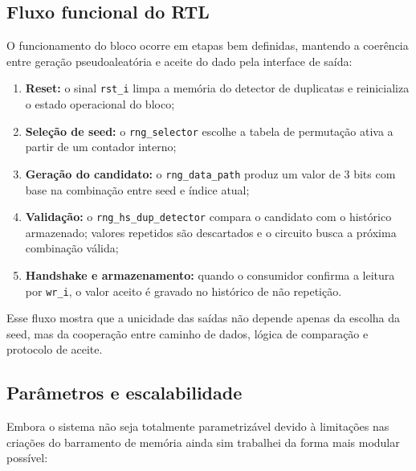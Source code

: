 \documentclass[12pt,a4paper]{article}
\begin{document}
	\subsection*{Fluxo funcional do RTL}
	
	O funcionamento do bloco ocorre em etapas bem definidas, mantendo a coerência entre geração pseudoaleatória e aceite do dado pela interface de saída:
	
	\begin{enumerate}[leftmargin=1.6em]
		\item \textbf{Reset:} o sinal \texttt{rst\_i} limpa a memória do detector de duplicatas e reinicializa o estado operacional do bloco;
		\item \textbf{Seleção de seed:} o \texttt{rng\_selector} escolhe a tabela de permutação ativa a partir de um contador interno;
		\item \textbf{Geração do candidato:} o \texttt{rng\_data\_path} produz um valor de 3 bits com base na combinação entre seed e índice atual;
		\item \textbf{Validação:} o \texttt{rng\_hs\_dup\_detector} compara o candidato com o histórico armazenado; valores repetidos são descartados e o circuito busca a próxima combinação válida;
		\item \textbf{Handshake e armazenamento:} quando o consumidor confirma a leitura por \texttt{wr\_i}, o valor aceito é gravado no histórico de não repetição.
	\end{enumerate}
	
	Esse fluxo mostra que a unicidade das saídas não depende apenas da escolha da seed, mas da cooperação entre caminho de dados, lógica de comparação e protocolo de aceite.
	
	\subsection*{Parâmetros e escalabilidade}
	
	Embora o sistema não seja totalmente parametrizável devido à limitações nas criações do barramento de memória ainda sim trabalhei da forma mais modular possível:
	
	\renewcommand{\arraystretch}{1.4}
	\setlength{\tabcolsep}{5pt}
	
\end{document}
